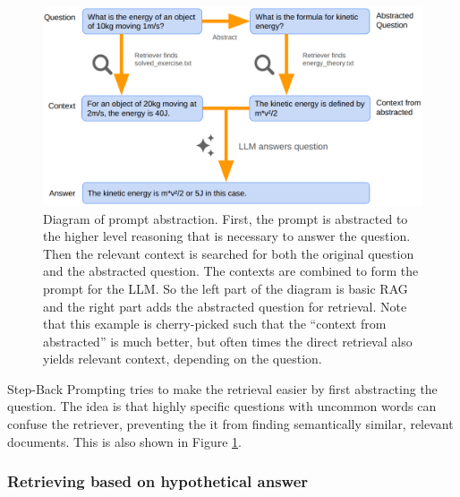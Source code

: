 \begin{figure}[h]
	\centering
	\includegraphics[width=0.9\linewidth]{fig/rag_abstract_prompt.png}
	\caption{Diagram of prompt abstraction. First, the prompt is abstracted to the higher level reasoning that is necessary to answer the question. Then the relevant context is searched for both the original question and the abstracted question. The contexts are combined to form the prompt for the LLM. So the left part of the diagram is basic RAG and the right part adds the abstracted question for retrieval. Note that this example is cherry-picked such that the ``context from abstracted'' is much better, but often times the direct retrieval also yields relevant context, depending on the question.}
	\label{fig:rag_abstract_prompt}
\end{figure}

Step-Back Prompting \cite{zheng2023takeastepback} tries to make the retrieval easier by first abstracting the question. The idea is that highly specific questions with uncommon words can confuse the retriever, preventing the it from finding semantically similar, relevant documents. This is also shown in Figure \ref{fig:rag_abstract_prompt}.

\subsubsection{Retrieving based on hypothetical answer}

